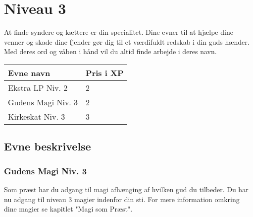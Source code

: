 \chapter{Niveau 3}
At finde syndere og kættere er din specialitet. Dine evner til at hjælpe dine venner og skade dine fjender gør dig til et værdifuldt redskab i din guds hænder. Med deres ord og våben i hånd vil du altid finde arbejde i deres navn.

\begin{table}[H]
    \centering
    \begin{tabular}{|p{}|p{}|}
    \rowcolor{cerulean!80}\hline
        Evne navn & Pris i XP \\\hline
            Ekstra LP Niv. 2 & 2\\\hline
            Gudens Magi Niv. 3 & 2\\\hline
            Kirkeskat Niv. 3 & 3\\\hline
    \end{tabular}
\end{table}

\section{Evne beskrivelse}



\subsection{Gudens Magi Niv. 3}
Som præst har du adgang til magi afhænging af hvilken gud du tilbeder. Du har nu adgang til niveau 3 magier indenfor din sti. For mere information omkring dine magier se kapitlet "Magi som Præst".


